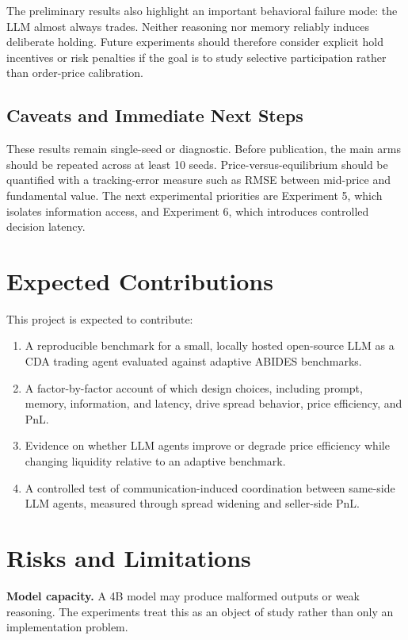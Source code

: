 \documentclass[11pt]{article}
\begin{document}
The preliminary results also highlight an important behavioral failure mode: the LLM almost always trades. Neither reasoning nor memory reliably induces deliberate holding. Future experiments should therefore consider explicit hold incentives or risk penalties if the goal is to study selective participation rather than order-price calibration.

\subsection{Caveats and Immediate Next Steps}

These results remain single-seed or diagnostic. Before publication, the main arms should be repeated across at least 10 seeds. Price-versus-equilibrium should be quantified with a tracking-error measure such as RMSE between mid-price and fundamental value. The next experimental priorities are Experiment 5, which isolates information access, and Experiment 6, which introduces controlled decision latency.

\section{Expected Contributions}

This project is expected to contribute:

\begin{enumerate}
    \item A reproducible benchmark for a small, locally hosted open-source LLM as a CDA trading agent evaluated against adaptive ABIDES benchmarks.
    \item A factor-by-factor account of which design choices, including prompt, memory, information, and latency, drive spread behavior, price efficiency, and PnL.
    \item Evidence on whether LLM agents improve or degrade price efficiency while changing liquidity relative to an adaptive benchmark.
    \item A controlled test of communication-induced coordination between same-side LLM agents, measured through spread widening and seller-side PnL.
\end{enumerate}

\section{Risks and Limitations}

\textbf{Model capacity.} A 4B model may produce malformed outputs or weak reasoning. The experiments treat this as an object of study rather than only an implementation problem.
\end{document}
